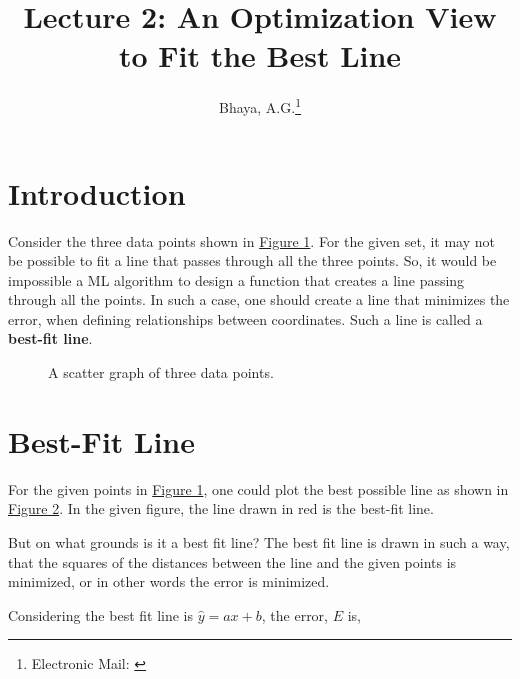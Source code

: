\documentclass{article}
\title{\textbf{Lecture 2: An Optimization View to Fit the Best Line}}
\author{Bhaya, A.G.\thanks{Electronic Mail: \href{mailto:contact@angubh.io}{\code{ananya.gb@nbu.ac.in}}}
}
\newcommand{\figref}[1]{\href{fig:#1}{Figure #1}}
\begin{document}
    \maketitle
    \tableofcontents

    \section{Introduction}
    Consider the three data points shown in \figref{1}. For the given set, it may not be possible to fit a line that passes through all the three points. So, it would be impossible a ML algorithm to design a function that creates a line passing through all the points. In such a case, one should create a line that minimizes the error, when defining relationships between coordinates. Such a line is called a \textbf{best-fit line}.

    \begin{figure}[ht]
        \centering
        \caption{A scatter graph of three data points.}
        \label{fig:1}
    \end{figure}

    \section{Best-Fit Line}

    For the given points in \figref{1}, one could plot the best possible line as shown in \figref{2}. In the given figure, the line drawn in red is the best-fit line.

    But on what grounds is it a best fit line? The best fit line is drawn in such a way, that the squares of the distances between the line and the given points is minimized, or in other words the error is minimized.

    Considering the best fit line is \(\hat{y}=ax+b\), the error, \(E\) is,
\end{document}
